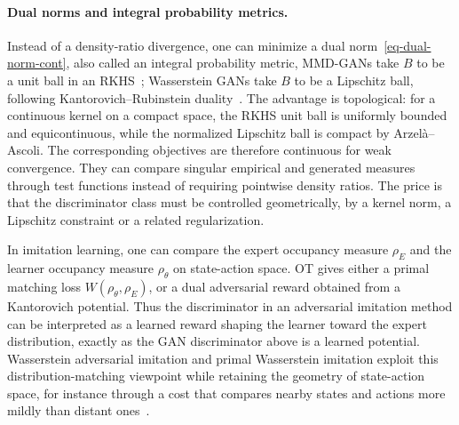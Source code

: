\paragraph{Dual norms and integral probability metrics.}

Instead of a density-ratio divergence, one can minimize a dual norm~\eqref{eq-dual-norm-cont}, also called an integral probability metric,
MMD-GANs take $B$ to be a unit ball in an RKHS~\cite{MMD-GAN}; Wasserstein GANs take $B$ to be a Lipschitz ball, following Kantorovich--Rubinstein duality~\cite{WassersteinGAN,FrognerNIPS}. The advantage is topological: for a continuous kernel on a compact space, the RKHS unit ball is uniformly bounded and equicontinuous, while the normalized Lipschitz ball is compact by Arzel\`a--Ascoli. The corresponding objectives are therefore continuous for weak convergence. They can compare singular empirical and generated measures through test functions instead of requiring pointwise density ratios. The price is that the discriminator class must be controlled geometrically, by a kernel norm, a Lipschitz constraint or a related regularization.
%

\begin{example}\label{ex-imitation-learning-ot}
	In imitation learning, one can compare the expert occupancy measure \(\rho_E\) and the learner occupancy measure \(\rho_\theta\) on state-action space. OT gives either a primal matching loss \(W(\rho_\theta,\rho_E)\), or a dual adversarial reward obtained from a Kantorovich potential. Thus the discriminator in an adversarial imitation method can be interpreted as a learned reward shaping the learner toward the expert distribution, exactly as the GAN discriminator above is a learned potential. Wasserstein adversarial imitation and primal Wasserstein imitation exploit this distribution-matching viewpoint while retaining the geometry of state-action space, for instance through a cost that compares nearby states and actions more mildly than distant ones~\cite{XiaoHermanWagnerZiescheEtesamiLinh2019WAIL,DadashiHussenotGeistPietquin2020PWIL}.
\end{example}

